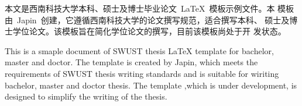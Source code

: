 \begin{zhabstract}
  本文是西南科技大学本科、硕士及博士毕业论文~\LaTeX{}~模板示例文件。本
  模板由~Japin~创建，它遵循西南科技大学的论文撰写规范，适合撰写本科、
  硕士及博士学位论文。该模板旨在简化学位论文的撰写，目前该模板尚处于开
  发状态。
\end{zhabstract}


\begin{enabstract}
  This is a smaple document of SWUST thesis \LaTeX{} template for
  bachelor, master and doctor. The template is created by Japin, which
  meets the requirements of SWUST thesis writing standards and is
  suitable for wiriting bachelor, master and doctor thesis. The
  template ,which is under development, is designed to simplify the
  writing of the thesis.
\end{enabstract}

